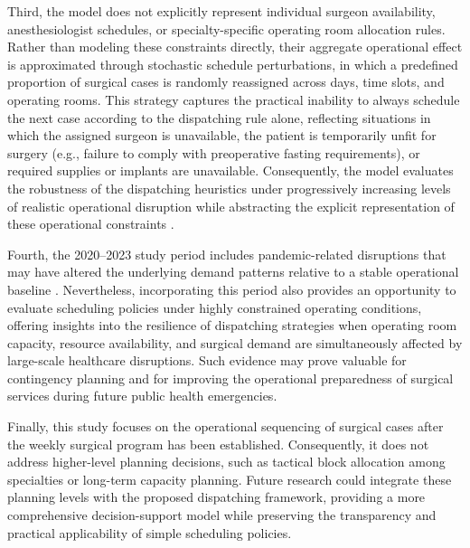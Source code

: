 \documentclass[sn-mathphys-num]{sn-jnl}
\begin{document}
    Third, the model does not explicitly represent individual surgeon availability, anesthesiologist schedules, or specialty-specific operating room allocation rules. Rather than modeling these constraints directly, their aggregate operational effect is approximated through stochastic schedule perturbations, in which a predefined proportion of surgical cases is randomly reassigned across days, time slots, and operating rooms. This strategy captures the practical inability to always schedule the next case according to the dispatching rule alone, reflecting situations in which the assigned surgeon is unavailable, the patient is temporarily unfit for surgery (e.g., failure to comply with preoperative fasting requirements), or required supplies or implants are unavailable. Consequently, the model evaluates the robustness of the dispatching heuristics under progressively increasing levels of realistic operational disruption while abstracting the explicit representation of these operational constraints \cite{tsang2025}.
    
    Fourth, the 2020--2023 study period includes pandemic-related disruptions that may have altered the underlying demand patterns relative to a stable operational baseline \cite{campos2024examining}. Nevertheless, incorporating this period also provides an opportunity to evaluate scheduling policies under highly constrained operating conditions, offering insights into the resilience of dispatching strategies when operating room capacity, resource availability, and surgical demand are simultaneously affected by large-scale healthcare disruptions. Such evidence may prove valuable for contingency planning and for improving the operational preparedness of surgical services during future public health emergencies.
    
    Finally, this study focuses on the operational sequencing of surgical cases after the weekly surgical program has been established. Consequently, it does not address higher-level planning decisions, such as tactical block allocation among specialties or long-term capacity planning. Future research could integrate these planning levels with the proposed dispatching framework, providing a more comprehensive decision-support model while preserving the transparency and practical applicability of simple scheduling policies.
    
\end{document}
